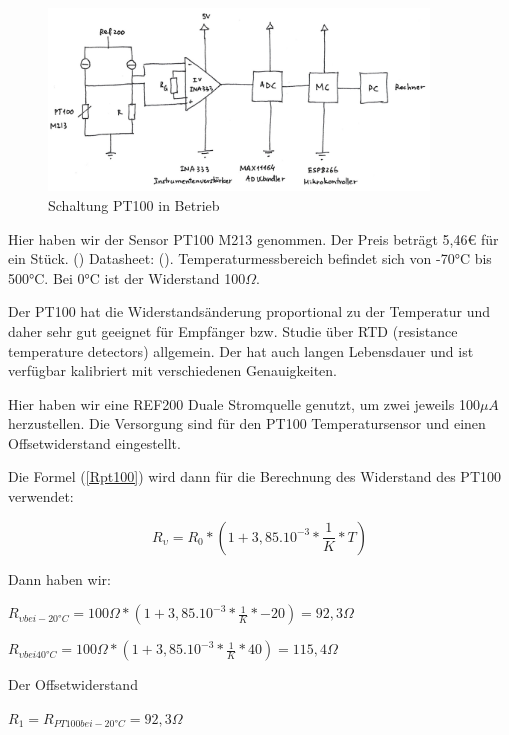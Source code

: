 \documentclass[12pt]{article}
\begin{document}
\begin{figure}[h]
  \centering
  \label{fig:pt100schaltung}
  \includegraphics[width=0.9\textwidth]{PT100Schaltung}
  \caption{Schaltung PT100 in Betrieb }
\end{figure}

Hier haben wir der Sensor PT100 M213 genommen. Der Preis beträgt 5,46€ für ein Stück. (\cite{MouserElectronics.2021c}) Datasheet: (\cite{Pustelnik.2019}). Temperaturmessbereich befindet sich von -70°C bis 500°C. Bei 0°C ist der Widerstand 100$\Omega$.

Der PT100 hat die Widerstandsänderung proportional zu der Temperatur und daher sehr gut geeignet für Empfänger bzw. Studie über RTD (resistance temperature detectors) allgemein. Der hat auch langen Lebensdauer und ist verfügbar kalibriert mit verschiedenen Genauigkeiten. 

Hier haben wir eine REF200 Duale Stromquelle genutzt, um zwei jeweils 100$\mu A$ herzustellen. Die Versorgung sind für den PT100 Temperatursensor und einen Offsetwiderstand eingestellt.

Die Formel (\ref{Rpt100}) wird dann für die Berechnung des Widerstand des PT100 verwendet:

\begin{equation}\label{Rpt100}
R_\upsilon = R_0 * (1 + 3,85.10^{-3} * \frac{1}{K} * T) 
\end{equation}

Dann haben wir: 

\begin{center}
$R_{\upsilon bei -20°C} = 100\Omega * (1 + 3,85.10^{-3} * \frac{1}{K} * -20) = 92,3\Omega$

$R_{\upsilon bei 40°C} = 100\Omega * (1 + 3,85.10^{-3} * \frac{1}{K} * 40) = 115,4\Omega$
\end{center}

Der Offsetwiderstand 

\begin{center}
  $R_1 = R_{PT100 bei -20°C} = 92,3\Omega$
\end{center}
\end{document}
